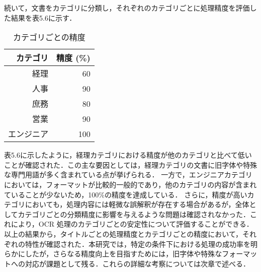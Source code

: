 続いて，文書をカテゴリに分類し，それぞれのカテゴリごとに処理精度を評価した結果を表5.6に示す．

\begin{table}[h]
  \begin{center}
  \begin{tabular}{|r|r|}
    \hline
    \textbf{カテゴリ} & \textbf{精度 (\%)} \\ \hline
    経理 & 60 \\ \hline
    人事 & 90 \\ \hline
    庶務 & 80 \\ \hline
    営業 & 90 \\ \hline
    エンジニア & 100 \\ \hline
  \end{tabular}
  \end{center}
  \caption{カテゴリごとの精度}
  \label{tab:category_accuracy}
\end{table}

表5.6に示したように，経理カテゴリにおける精度が他のカテゴリと比べて低いことが確認された．この主な要因としては，経理カテゴリの文書に旧字体や特殊な専門用語が多く含まれている点が挙げられる．
一方で，エンジニアカテゴリにおいては，フォーマットが比較的一般的であり，他のカテゴリの内容が含まれていることが少ないため，100\%の精度を達成している．
さらに，精度が高いカテゴリにおいても，処理内容には軽微な誤解釈が存在する場合があるが，全体としてカテゴリごとの分類精度に影響を与えるような問題は確認されなかった．これにより，OCR 処理のカテゴリごとの安定性について評価することができる．
以上の結果から，タイトルごとの処理精度とカテゴリごとの精度において，それぞれの特性が確認された．本研究では，特定の条件下における処理の成功率を明らかにしたが，さらなる精度向上を目指すためには，旧字体や特殊なフォーマットへの対応が課題として残る．これらの詳細な考察については次章で述べる．

